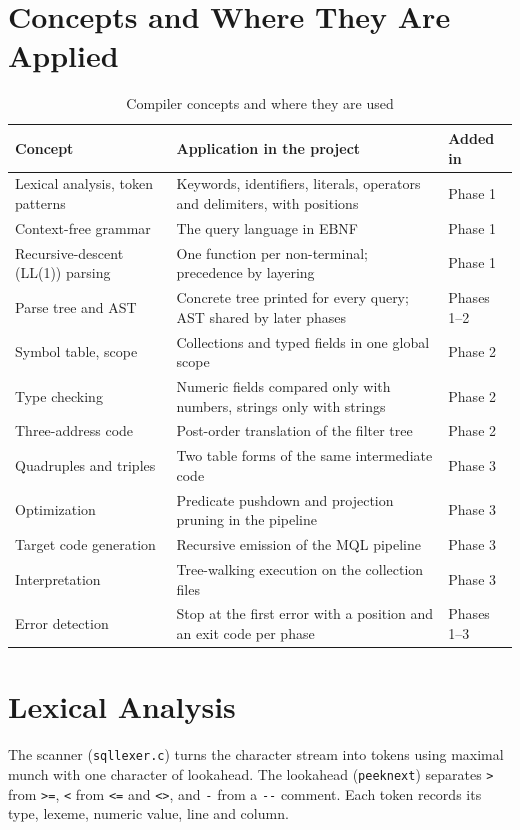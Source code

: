 \documentclass[12pt,a4paper]{report}
\newcommand{\codeus}{\textunderscore\allowbreak}
\DeclareRobustCommand{\code}[1]{\texttt{\let\_\codeus #1}}
\begin{document}
\section{Concepts and Where They Are Applied}
\begin{table}[H]
\centering\small
\begin{tabularx}{\linewidth}{|P{4.2cm}|L|P{2.0cm}|}
\hline
\textbf{Concept} & \textbf{Application in the project} & \textbf{Added in} \\ \hline
Lexical analysis, token patterns & Keywords, identifiers, literals, operators and delimiters, with positions & Phase 1 \\ \hline
Context-free grammar & The query language in EBNF & Phase 1 \\ \hline
Recursive-descent (LL(1)) parsing & One function per non-terminal; precedence by layering & Phase 1 \\ \hline
Parse tree and AST & Concrete tree printed for every query; AST shared by later phases & Phases 1--2 \\ \hline
Symbol table, scope & Collections and typed fields in one global scope & Phase 2 \\ \hline
Type checking & Numeric fields compared only with numbers, strings only with strings & Phase 2 \\ \hline
Three-address code & Post-order translation of the filter tree & Phase 2 \\ \hline
Quadruples and triples & Two table forms of the same intermediate code & Phase 3 \\ \hline
Optimization & Predicate pushdown and projection pruning in the pipeline & Phase 3 \\ \hline
Target code generation & Recursive emission of the MQL pipeline & Phase 3 \\ \hline
Interpretation & Tree-walking execution on the collection files & Phase 3 \\ \hline
Error detection & Stop at the first error with a position and an exit code per phase & Phases 1--3 \\ \hline
\end{tabularx}
\caption{Compiler concepts and where they are used}
\end{table}

\section{Lexical Analysis}
The scanner (\code{sql\_lexer.c}) turns the character stream into tokens using maximal munch with one character of lookahead. The lookahead (\code{peek\_next}) separates \code{>} from \code{>=}, \code{<} from \code{<=} and \code{<>}, and \code{-} from a \code{-{}-} comment. Each token records its type, lexeme, numeric value, line and column.
\end{document}
